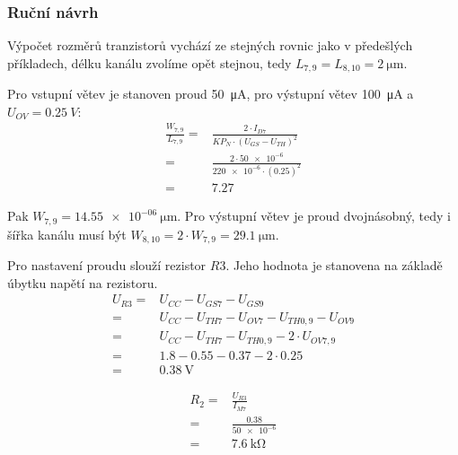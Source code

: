 \subsubsection{Ruční návrh}
Výpočet rozměrů tranzistorů vychází ze stejných rovnic jako v předešlých příkladech, délku kanálu zvolíme opět stejnou, tedy \(L_{7,9}=L_{8,10} = \qty{2}{\micro\meter}\). 

Pro vstupní větev je stanoven proud \qty{50}{\micro\ampere}, pro výstupní větev \qty{100}{\micro\ampere} a \(U_{OV} =\qty{0.25}{V}\):
\begin{align*}
    \frac{W_{7,9}}{L_{7,9}}=&\frac{2\cdot I_{D7}}{KP_{N}\cdot (U_{GS} -U_{TH})^2}\\
          =&\frac{2\cdot \num{50e-6}}{\num{220e-6} \cdot (\num{0.25})^2 } \\
          =&\num{7.27}
\end{align*}

Pak \(W_{7,9} =\qty{14.55e-06}{\micro\meter}\). Pro výstupní větev je proud dvojnásobný, tedy i šířka kanálu musí být \(W_{8,10}=2\cdot W_{7,9}=\qty{29,1}{\micro\meter}\).


Pro nastavení proudu slouží rezistor \(R3\). Jeho hodnota je stanovena na základě úbytku napětí na rezistoru.
\begin{align*}
    U_{R 3}=&U_{C C}-U_{G S 7}-U_{G S 9} \\
           =&U_{C C}-U_{T H 7}- U_{O V 7}-U_{TH0, 9}-U_{O V 9} \\
           =&U_{C C}-U_{T H 7}-U_{TH0, 9}-2 \cdot U_{O V 7,9} \\
           =&\num{1.8}-\num{0.55}-\num{0.37}-2 \cdot \num{0.25} \\
           =&\qty{0.38}{\volt}
\end{align*}

\begin{align*}
    R_{2} =& \frac{U_{R3}}{I_{M7} } \\
          =& \frac{\num{0.38}}{\num{50e-6}} \\
          =& \qty{7.6}{\kilo\ohm}
\end{align*}

